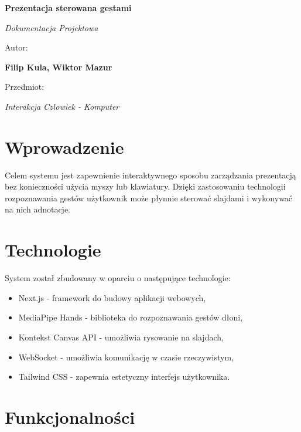 \documentclass[12pt,a4paper]{article}
\begin{document}
\begin{titlepage}
    \begin{center}
        \vspace*{2cm}
        {\huge\bfseries Prezentacja sterowana gestami\par}
        \vspace{1.5cm}
        {\Large\itshape Dokumentacja Projektowa\par}
        \vspace{1.5cm}
        {\large Autor:\par}
        {\large\bfseries Filip Kula, Wiktor Mazur\par}
        \vspace{1cm}
        {\large Przedmiot:\par}
        {\large\itshape Interakcja Człowiek - Komputer\par}
    \end{center}
\end{titlepage}

\newpage

\section{Wprowadzenie}

Celem systemu jest zapewnienie interaktywnego sposobu zarządzania prezentacją bez konieczności użycia myszy lub klawiatury. Dzięki zastosowaniu technologii rozpoznawania gestów użytkownik może płynnie sterować slajdami i wykonywać na nich adnotacje.

\section{Technologie}

System został zbudowany w oparciu o następujące technologie:
\begin{itemize}
    \item Next.js - framework do budowy aplikacji webowych,
    \item MediaPipe Hands - biblioteka do rozpoznawania gestów dłoni,
    \item Kontekst Canvas API - umożliwia rysowanie na slajdach,
    \item WebSocket - umożliwia komunikację w czasie rzeczywistym,
    \item Tailwind CSS - zapewnia estetyczny interfejs użytkownika.
\end{itemize}

\section{Funkcjonalności}
\end{document}
